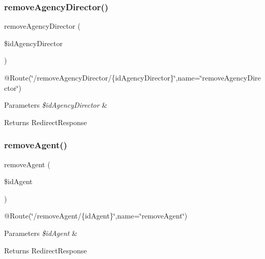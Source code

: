 \subsubsection{\texorpdfstring{removeAgencyDirector()}{removeAgencyDirector()}}
{\footnotesize\ttfamily remove\+Agency\+Director (\begin{DoxyParamCaption}\item[{}]{\$id\+Agency\+Director }\end{DoxyParamCaption})}

@\+Route(\char`\"{}/remove\+Agency\+Director/\{id\+Agency\+Director\}\char`\"{},name=\char`\"{}remove\+Agency\+Director\char`\"{}) 
\begin{DoxyParams}{Parameters}
{\em \$id\+Agency\+Director} & \\
\hline
\end{DoxyParams}
\begin{DoxyReturn}{Returns}
Redirect\+Response 
\end{DoxyReturn}
\mbox{\label{class_app_1_1_controller_1_1_back_office_controller_a6a57a8759329d23af8df40c5ec5494f4}} 
\subsubsection{\texorpdfstring{removeAgent()}{removeAgent()}}
{\footnotesize\ttfamily remove\+Agent (\begin{DoxyParamCaption}\item[{}]{\$id\+Agent }\end{DoxyParamCaption})}

@\+Route(\char`\"{}/remove\+Agent/\{id\+Agent\}\char`\"{},name=\char`\"{}remove\+Agent\char`\"{}) 
\begin{DoxyParams}{Parameters}
{\em \$id\+Agent} & \\
\hline
\end{DoxyParams}
\begin{DoxyReturn}{Returns}
Redirect\+Response 
\end{DoxyReturn}
\mbox{\label{class_app_1_1_controller_1_1_back_office_controller_a56c2640063c53b8dde5edfc465887a6c}} 
